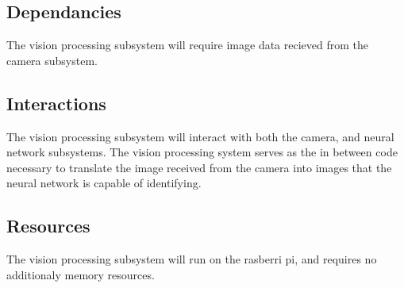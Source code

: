\subsection{Dependancies} 

The vision processing subsystem will require image data recieved from the camera subsystem.

\subsection{Interactions}

The vision processing subsystem will interact with both the camera, and neural network subsystems. 
The vision processing system serves as the in between code necessary to translate the image received from the camera
into images that the neural network is capable of identifying.

\subsection{Resources} 

The vision processing subsystem will run on the rasberri pi, 
and requires no additionaly memory resources.




